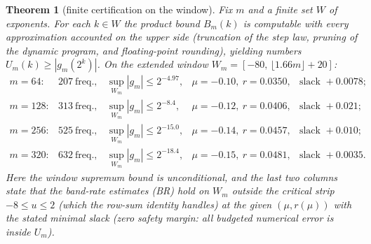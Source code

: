 \documentclass[11pt]{article}
\newtheorem{theorem}{Theorem}[section]
\theoremstyle{definition}
\newcommand{\floor}[1]{\lfloor #1\rfloor}
\begin{document}
\begin{theorem}[finite certification on the window]\label{thm:instances}
Fix $m$ and a finite set $W$ of exponents. For each $k\in W$ the product
bound $B_m(k)$ is computable with every approximation accounted on the
upper side (truncation of the step law, pruning of the dynamic program,
and floating-point rounding), yielding numbers $U_m(k)\ge |g_m(2^k)|$.
On the extended window $W_m=[-80,\,\floor{1.66m}+20]$:
\[
\begin{array}{lllll}
m=64: & 207\ \text{freq.}, & \sup_{W_m}|g_m|\le 2^{-4.97}, &
\mu=-0.10,\ r=0.0350, & \text{slack } +0.0078;\\
m=128: & 313\ \text{freq.}, & \sup_{W_m}|g_m|\le 2^{-8.4}, &
\mu=-0.12,\ r=0.0406, & \text{slack } +0.021;\\
m=256: & 525\ \text{freq.}, & \sup_{W_m}|g_m|\le 2^{-15.0}, &
\mu=-0.14,\ r=0.0457, & \text{slack } +0.010;\\
m=320: & 632\ \text{freq.}, & \sup_{W_m}|g_m|\le 2^{-18.4}, &
\mu=-0.15,\ r=0.0481, & \text{slack } +0.0035.
\end{array}
\]
Here the window supremum bound is unconditional, and the last two columns
state that the band-rate estimates (BR) hold on $W_m$ outside the critical
strip $-8\le u\le 2$ (which the row-sum identity handles) at the given
$(\mu,r(\mu))$ with the stated minimal slack (zero safety margin: all
budgeted numerical error is inside $U_m$).
\end{theorem}
\end{document}
